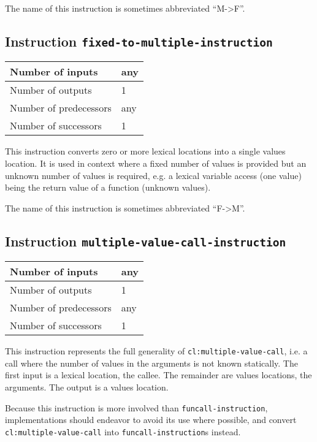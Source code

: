The name of this instruction is sometimes abbreviated ``M->F''.

\subsection{Instruction \texttt{fixed-to-multiple-instruction}}
\label{hir-instruction-fixed-to-multiple}

\begin{tabular}{|l|l|}
  \hline
  Number of inputs & any\\
  \hline
  Number of outputs & 1\\
  \hline
  Number of predecessors & any\\
  \hline
  Number of successors & 1\\
  \hline
\end{tabular}

This instruction converts zero or more lexical locations into a single
values location. It is used in context where a fixed number of values
is provided but an unknown number of values is required, e.g. a
lexical variable access (one value) being the return value of a
function (unknown values).

The name of this instruction is sometimes abbreviated ``F->M''.

\subsection{Instruction \texttt{multiple-value-call-instruction}}
\label{hir-instruction-multiple-value-call}

\begin{tabular}{|l|l|}
  \hline
  Number of inputs & any\\
  \hline
  Number of outputs & 1\\
  \hline
  Number of predecessors & any\\
  \hline
  Number of successors & 1\\
  \hline
\end{tabular}

This instruction represents the full generality of
\texttt{cl:multiple-value-call}, i.e. a call where the number of
values in the arguments is not known statically. The first input is
a lexical location, the callee. The remainder are values locations,
the arguments. The output is a values location.

Because this instruction is more involved than
\texttt{funcall-instruction}, implementations should endeavor to
avoid its use where possible, and convert
\texttt{cl:multiple-value-call} into \texttt{funcall-instruction}s
instead.

